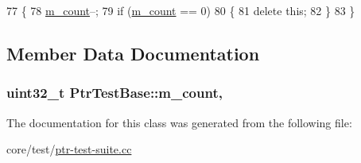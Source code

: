 \begin{DoxyCode}
77 \{
78   \hyperlink{classPtrTestBase_a9a9fd7038e097a4fa3f46659f0270a1e}{m\_count}--;
79   \textcolor{keywordflow}{if} (\hyperlink{classPtrTestBase_a9a9fd7038e097a4fa3f46659f0270a1e}{m\_count} == 0)
80     \{
81       \textcolor{keyword}{delete} \textcolor{keyword}{this};
82     \}
83 \}
\end{DoxyCode}


\subsection{Member Data Documentation}
\subsubsection[{\texorpdfstring{m\+\_\+count}{m_count}}]{\setlength{\rightskip}{0pt plus 5cm}uint32\+\_\+t Ptr\+Test\+Base\+::m\+\_\+count\hspace{0.3cm}{\ttfamily [mutable]}, {\ttfamily [private]}}\hypertarget{classPtrTestBase_a9a9fd7038e097a4fa3f46659f0270a1e}{}\label{classPtrTestBase_a9a9fd7038e097a4fa3f46659f0270a1e}


The documentation for this class was generated from the following file\+:\begin{DoxyCompactItemize}
\item 
core/test/\hyperlink{ptr-test-suite_8cc}{ptr-\/test-\/suite.\+cc}\end{DoxyCompactItemize}

